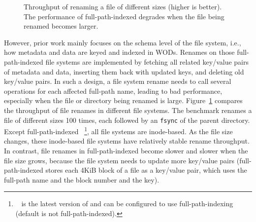 \begin{figure}[t]
    \centering
    \caption[The performance of file renames in full-path-indexed file systems]{\label{fig:file_rename_intro}
        Throughput of renaming a file of different sizes (higher is better).
        The performance of full-path-indexed \betrfsThree
        degrades when the file being renamed becomes larger.}
\end{figure}

However, prior work mainly focuses on the schema level of the file system, i.e.,
how metadata and data are keyed and indexed in WODs.
Renames on those full-path-indexed file systems are implemented by fetching all
related key/value pairs of metadata and data,
inserting them back with updated keys, and deleting old key/value pairs.
In such a design, a file system rename needs to call several operations for each
affected full-path name, leading to bad performance,
especially when the file or directory being renamed is large.
Figure~\ref{fig:file_rename_intro} compares the throughput of file renames in
different file systems.
The benchmark renames a file of different sizes 100 times, each followed by an
\texttt{fsync} of the parent directory.
Except full-path-indexed \betrfsThree~\footnote{\betrfsThree~\citep{betrfs3}
is the latest
version of \betrfs and can be configured to use full-path-indexing
(default \betrfsThree is not full-path-indexed).},
all file systems are inode-based.
As the file size changes, these inode-based file systems have relatively
stable rename throughput.
In contrast, file renames in full-path-indexed \betrfsThree become slower and
slower when the file size grows,
because the file system needs to update more key/value pairs
(full-path-indexed \betrfsThree stores each 4KiB block of a file as
a key/value pair,
which uses the full-path name and the block number and the key).

